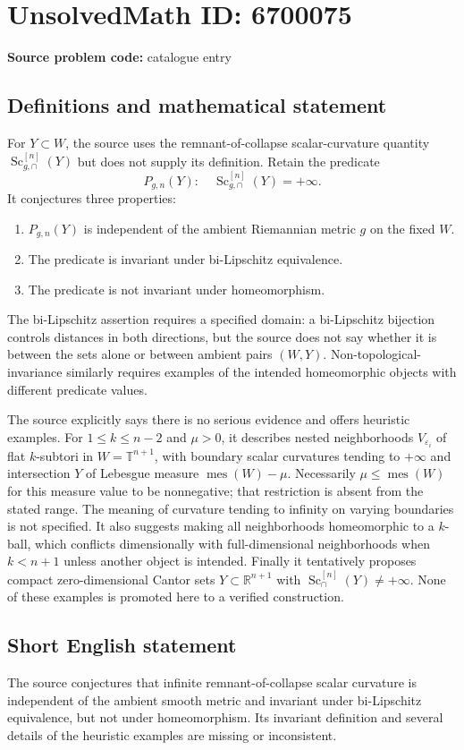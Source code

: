 \documentclass[11pt]{article}
\begin{document}
\section*{UnsolvedMath ID: 6700075}
\textbf{Source problem code:} catalogue entry
\subsection{Definitions and mathematical statement}
For $Y\subset W$, the source uses the remnant-of-collapse scalar-curvature quantity $\operatorname{Sc}^{[n]}_{g,\cap}(Y)$ but does not supply its definition. Retain the predicate
\[
P_{g,n}(Y):\quad\operatorname{Sc}^{[n]}_{g,\cap}(Y)=+\infty.
\]
It conjectures three properties:
\begin{enumerate}
\item $P_{g,n}(Y)$ is independent of the ambient Riemannian metric $g$ on the fixed $W$.
\item The predicate is invariant under bi-Lipschitz equivalence.
\item The predicate is not invariant under homeomorphism.
\end{enumerate}
The bi-Lipschitz assertion requires a specified domain: a bi-Lipschitz bijection controls distances in both directions, but the source does not say whether it is between the sets alone or between ambient pairs $(W,Y)$. Non-topological-invariance similarly requires examples of the intended homeomorphic objects with different predicate values.

The source explicitly says there is no serious evidence and offers heuristic examples. For $1\leq k\leq n-2$ and $\mu>0$, it describes nested neighborhoods $V_{\varepsilon_i}$ of flat $k$-subtori in $W=\mathbb T^{n+1}$, with boundary scalar curvatures tending to $+\infty$ and intersection $Y$ of Lebesgue measure $\operatorname{mes}(W)-\mu$. Necessarily $\mu\leq\operatorname{mes}(W)$ for this measure value to be nonnegative; that restriction is absent from the stated range. The meaning of curvature tending to infinity on varying boundaries is not specified. It also suggests making all neighborhoods homeomorphic to a $k$-ball, which conflicts dimensionally with full-dimensional neighborhoods when $k<n+1$ unless another object is intended. Finally it tentatively proposes compact zero-dimensional Cantor sets $Y\subset\mathbb R^{n+1}$ with $\operatorname{Sc}^{[n]}_{\cap}(Y)\ne+\infty$. None of these examples is promoted here to a verified construction.
\subsection{Short English statement}
The source conjectures that infinite remnant-of-collapse scalar curvature is independent of the ambient smooth metric and invariant under bi-Lipschitz equivalence, but not under homeomorphism. Its invariant definition and several details of the heuristic examples are missing or inconsistent.
\end{document}
